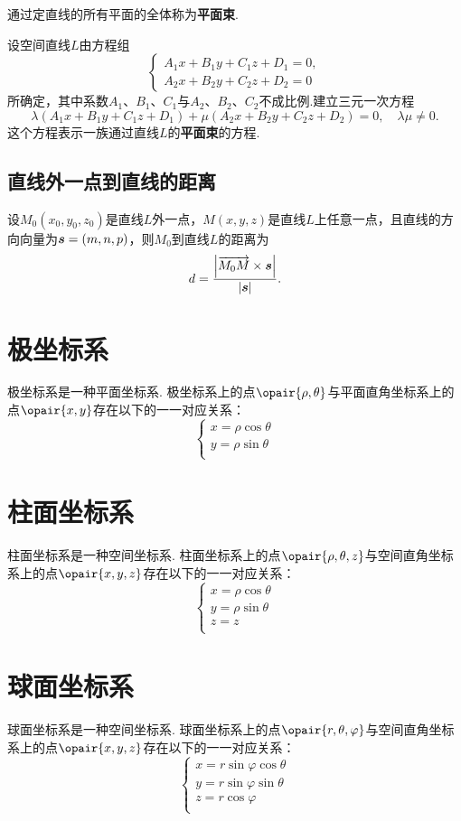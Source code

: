 \begin{definition}
通过定直线的所有平面的全体称为\textbf{平面束}.
\end{definition}

\begin{theorem}
设空间直线\(L\)由方程组\[
\left\{ \begin{array}{c}
A_1x+B_1y+C_1z+D_1=0, \\
A_2x+B_2y+C_2z+D_2=0
\end{array} \right.
\]所确定，其中系数\(A_1\)、\(B_1\)、\(C_1\)与\(A_2\)、\(B_2\)、\(C_2\)不成比例.建立三元一次方程\[
\lambda(A_1x+B_1y+C_1z+D_1)+\mu(A_2x+B_2y+C_2z+D_2)=0, \quad \lambda\mu\neq0.
\]这个方程表示一族通过直线\(L\)的\textbf{平面束}的方程.
\end{theorem}

\subsection{直线外一点到直线的距离}
设\(M_0(x_0,y_0,z_0)\)是直线\(L\)外一点，\(M(x,y,z)\)是直线\(L\)上任意一点，且直线的方向向量为\(\boldsymbol{s}=(m,n,p)\)，则\(M_0\)到直线\(L\)的距离为\[
d=\frac{\abs{\overrightarrow{M_0M}\times\boldsymbol{s}}}{\abs{\boldsymbol{s}}}.
\]

\section{极坐标系}
极坐标系是一种平面坐标系.
极坐标系上的点\(\opair{\rho,\theta}\)与平面直角坐标系上的点\(\opair{x,y}\)存在以下的一一对应关系：\[
\left\{ \begin{array}{l}
x = \rho\cos\theta \\
y = \rho\sin\theta \\
\end{array} \right.
\]

\section{柱面坐标系}
柱面坐标系是一种空间坐标系.
柱面坐标系上的点\(\opair{\rho,\theta,z}\)与空间直角坐标系上的点\(\opair{x,y,z}\)存在以下的一一对应关系：\[
\left\{ \begin{array}{l}
x = \rho\cos\theta \\
y = \rho\sin\theta \\
z = z \\
\end{array} \right.
\]

\section{球面坐标系}
球面坐标系是一种空间坐标系.
球面坐标系上的点\(\opair{r,\theta,\varphi}\)与空间直角坐标系上的点\(\opair{x,y,z}\)存在以下的一一对应关系：\[
\left\{ \begin{array}{l}
x = r \sin\varphi \cos\theta \\
y = r \sin\varphi \sin\theta \\
z = r \cos\varphi \\
\end{array} \right.
\]

